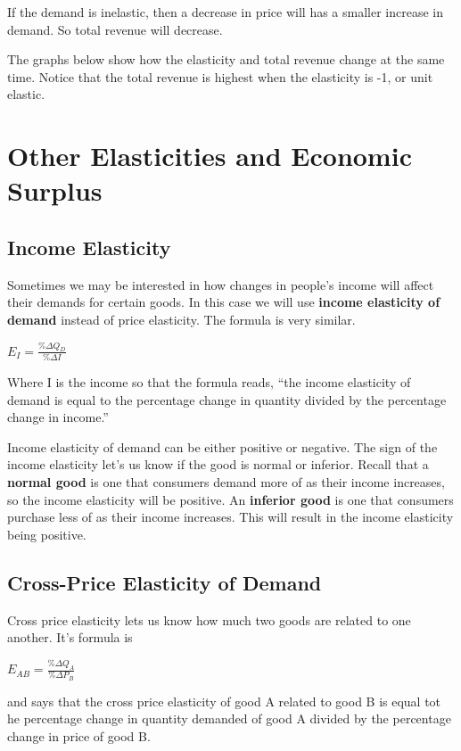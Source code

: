 \documentclass[
]{book}
\begin{document}
If the demand is inelastic, then a decrease in price will has a smaller increase in demand. So total revenue will decrease.

The graphs below show how the elasticity and total revenue change at the same time. Notice that the total revenue is highest when the elasticity is -1, or unit elastic.

\chapter{Other Elasticities and Economic Surplus}\label{other-elasticities-and-economic-surplus}

\section{Income Elasticity}\label{income-elasticity}

Sometimes we may be interested in how changes in people's income will affect their demands for certain goods. In this case we will use \textbf{income elasticity of demand} instead of price elasticity. The formula is very similar.

\(E_I = \frac{\% \Delta Q_D}{\% \Delta I}\)

Where I is the income so that the formula reads, ``the income elasticity of demand is equal to the percentage change in quantity divided by the percentage change in income.''

Income elasticity of demand can be either positive or negative. The sign of the income elasticity let's us know if the good is normal or inferior. Recall that a \textbf{normal good} is one that consumers demand more of as their income increases, so the income elasticity will be positive.
An \textbf{inferior good} is one that consumers purchase less of as their income increases. This will result in the income elasticity being positive.

\section{Cross-Price Elasticity of Demand}\label{cross-price-elasticity-of-demand}

Cross price elasticity lets us know how much two goods are related to one another. It's formula is

\(E_{AB} = \frac{\%\Delta Q_A}{\% \Delta P_B}\)

and says that the cross price elasticity of good A related to good B is equal tot he percentage change in quantity demanded of good A divided by the percentage change in price of good B.
\end{document}
